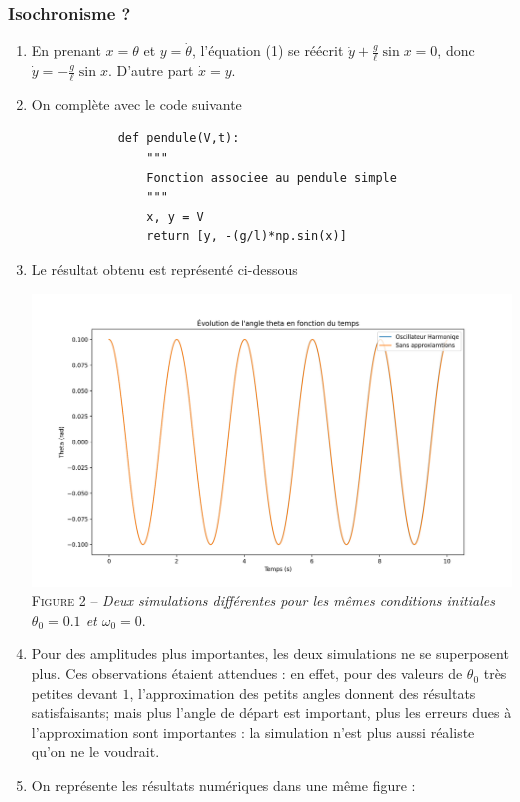 \documentclass[17pt]{article}
\begin{document}
	\subsubsection*{Isochronisme ?}
	\begin{enumerate}[start=5]
		\item En prenant $x=\theta$ et $y=\dot{\theta}$, l'équation (1) se réécrit $\dot{y}+\frac g\ell\sin x= 0$, donc $\boxed{\dot{y}=-\frac g\ell \sin x}$. D'autre part $\boxed{\dot{x}=y}$. 
		\item On complète avec le code suivante
		\begin{lstlisting}
			def pendule(V,t):
			    """
			    Fonction associee au pendule simple
			    """
			    x, y = V
			    return [y, -(g/l)*np.sin(x)]
		\end{lstlisting}
		\item Le résultat obtenu est représenté ci-dessous
		\begin{center}
			\includegraphics[scale=0.4]{./img/question7.png}\\
			\textsc{Figure 2 – } \textit{Deux simulations différentes pour les mêmes conditions initiales $\theta_0=0.1$ et $\omega_0=0$}.
		\end{center}
		\item Pour des amplitudes plus importantes, les deux simulations ne se superposent plus. Ces observations étaient attendues : en effet, pour des valeurs de $\theta_0$ très petites devant $1$, l'approximation des petits angles donnent des résultats satisfaisants; mais plus l'angle de départ est important, plus les erreurs dues à l'approximation sont importantes : la simulation n'est plus aussi réaliste qu'on ne le voudrait.
		\item On représente les résultats numériques dans une même figure : 

\end{enumerate}
\end{document}
